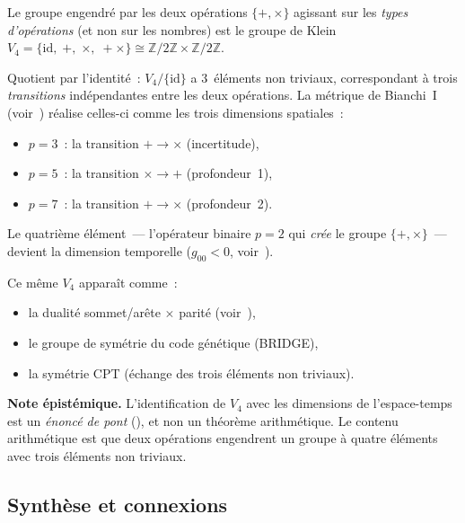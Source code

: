 \documentclass[12pt,a4paper]{article}
\begin{document}
\begin{remarque}
\label{rem:V4_dimensions}
Le groupe engendré par les deux opérations $\{+, \times\}$
agissant sur les \emph{types d'opérations} (et non sur les nombres)
est le groupe de Klein
$V_4 = \{\mathrm{id},\; +,\; \times,\; {+}{\times}\}
\cong \mathbb{Z}/2\mathbb{Z} \times \mathbb{Z}/2\mathbb{Z}$.

Quotient par l'identité~: $V_4 / \{\mathrm{id}\}$ a $3$~éléments non
triviaux, correspondant à trois \emph{transitions} indépendantes
entre les deux opérations. La métrique de Bianchi~I
(voir~\cite{companion_physics}) réalise celles-ci comme les trois
dimensions spatiales~:
\begin{itemize}[nosep]
\item $p = 3$~: la transition $+ \to \times$ (incertitude),
\item $p = 5$~: la transition $\times \to +$ (profondeur~1),
\item $p = 7$~: la transition $+ \to \times$ (profondeur~2).
\end{itemize}
Le quatrième élément~--- l'opérateur binaire $p = 2$ qui
\emph{crée} le groupe $\{+, \times\}$~--- devient la dimension
temporelle ($g_{00} < 0$, voir~\cite{companion_physics}).

Ce même $V_4$ apparaît comme~:
\begin{itemize}[nosep]
\item la dualité sommet/arête $\times$ parité
  (voir~\cite{companion_physics}),
\item le groupe de symétrie du code génétique (BRIDGE),
\item la symétrie CPT (échange des trois éléments non triviaux).
\end{itemize}

\textbf{Note épistémique.}
L'identification de $V_4$ avec les dimensions de l'espace-temps est
un \emph{énoncé de pont} (\cite{companion_M5}), et non un théorème
arithmétique. Le contenu arithmétique est que deux opérations
engendrent un groupe à quatre éléments avec trois éléments non
triviaux.
\end{remarque}

\subsection{Synthèse et connexions}
\label{sec:ch5_summary}
\end{document}
